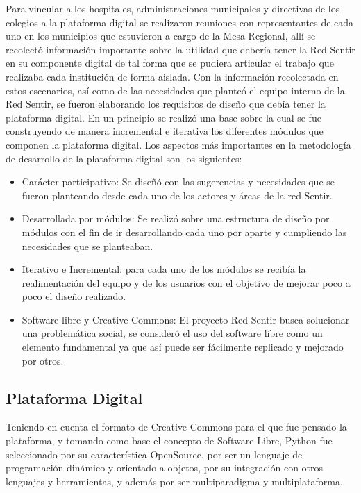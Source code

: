 \documentclass[journal,transmag]{IEEEtran}
\begin{document}
Para vincular a los hospitales, administraciones municipales y directivas de los colegios a la plataforma digital se realizaron reuniones con representantes de cada uno en los municipios que estuvieron a cargo de la Mesa Regional, allí se recolectó información importante sobre la utilidad que debería tener la Red Sentir en su componente digital de tal forma que se pudiera articular el trabajo que realizaba cada institución de forma aislada. Con la información recolectada en estos escenarios, así como de las necesidades que planteó el equipo interno de la Red Sentir, se fueron elaborando los requisitos de diseño que debía tener la plataforma digital. En un principio se realizó una base sobre la cual se fue construyendo de manera incremental e iterativa los diferentes módulos que componen la plataforma digital. Los aspectos más importantes en la metodología de desarrollo de la plataforma digital son los siguientes:

\begin{itemize}
\item Carácter participativo: Se diseñó con las sugerencias y necesidades que se fueron planteando desde cada uno de los actores y áreas de la red Sentir.

\item Desarrollada por módulos: Se realizó sobre una estructura de diseño por módulos con el fin de ir desarrollando cada uno por aparte y cumpliendo las necesidades que se planteaban.

\item Iterativo e Incremental: para cada uno de los módulos se recibía la realimentación del equipo y de los usuarios con el objetivo de mejorar poco a poco el diseño realizado.

\item Software libre y Creative Commons: El proyecto Red Sentir busca solucionar una problemática social, se consideró el uso del software libre como un elemento fundamental ya que así puede ser fácilmente replicado y mejorado por otros.
\end{itemize}

\subsection{Plataforma Digital}
Teniendo en cuenta el formato de Creative Commons para el que fue pensado la plataforma, y tomando como base el concepto de Software Libre, Python fue seleccionado por su característica OpenSource, por ser un lenguaje de programación dinámico y orientado a objetos, por su integración con otros lenguajes y herramientas, y además por ser multiparadigma y multiplataforma.
\end{document}
